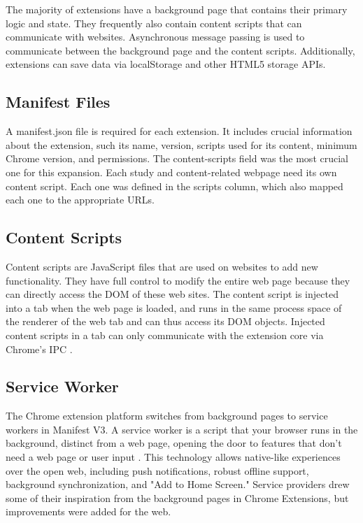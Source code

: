 The majority of extensions have a background page that contains their primary logic and state. They frequently also contain content scripts that can communicate with websites. Asynchronous message passing is used to communicate between the background page and the content scripts. Additionally, extensions can save data via localStorage and other HTML5 storage APIs.

\subsection{Manifest Files}

A manifest.json file is required for each extension. It includes crucial information about the extension, such its name, version, scripts used for its content, minimum Chrome version, and permissions. The content-scripts field was the most crucial one for this expansion. Each study and content-related webpage need its own content script. Each one was defined in the scripts column, which also mapped each one to the appropriate URLs.

\subsection{Content Scripts}

Content scripts are JavaScript files that are used on websites to add new functionality. They have full control to modify the entire web page because they can directly access the DOM of these web sites. The content script is injected into a tab when the web page is loaded, and runs in the same process space of the renderer of the web tab and can thus access its DOM objects. Injected content scripts in a tab can only communicate with the extension core via Chrome's IPC \autocite{liu2012chrome}.

\subsection{Service Worker}

The Chrome extension platform switches from background pages to service workers in Manifest V3. A service worker is a script that your browser runs in the background, distinct from a web page, opening the door to features that don't need a web page or user input \autocite{chrome2021service}. This technology allows native-like experiences over the open web, including push notifications, robust offline support, background synchronization, and "Add to Home Screen." Service providers drew some of their inspiration from the background pages in Chrome Extensions, but improvements were added for the web.

